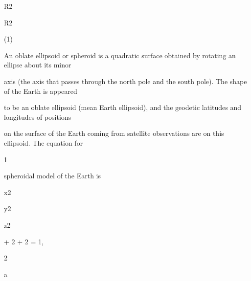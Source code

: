 \documentclass[a4paper,portrait,12pt]{article}
\begin{document}
\begin{flushleft}
R2
\end{flushleft}


\begin{flushleft}
R2
\end{flushleft}





(1)





\begin{flushleft}
An oblate ellipsoid or spheroid is a quadratic surface obtained by rotating an ellipse about its minor
\end{flushleft}


\begin{flushleft}
axis (the axis that passes through the north pole and the south pole). The shape of the Earth is appeared
\end{flushleft}


\begin{flushleft}
to be an oblate ellipsoid (mean Earth ellipsoid), and the geodetic latitudes and longitudes of positions
\end{flushleft}


\begin{flushleft}
on the surface of the Earth coming from satellite observations are on this ellipsoid. The equation for
\end{flushleft}





1





\begin{flushleft}
\newpage
spheroidal model of the Earth is
\end{flushleft}


\begin{flushleft}
x2
\end{flushleft}


\begin{flushleft}
y2
\end{flushleft}


\begin{flushleft}
z2
\end{flushleft}


+ 2 + 2 = 1,


2


\begin{flushleft}
a
\end{flushleft}
\end{document}
